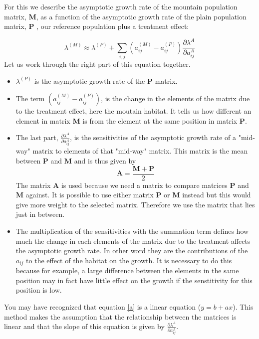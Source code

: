 \documentclass{article}\usepackage[]{graphicx}\usepackage[]{color}
\begin{document}
For this we describe the asymptotic growth rate of the mountain population matrix, $\boldsymbol{M}$, as a function of the asymptotic growth rate of the plain population matrix, $\boldsymbol{P}$ , our reference population plus a treatment effect:  

\begin{equation}\label{a}
\lambda^{(M)} \approx \lambda^{(P)}+\sum_{i,j}{(a^{(M)}_{ij}-a^{(P)}_{ij})} \frac{ \partial\lambda^{A}}{\partial a^{A}_{ij}}
\end{equation}
Let us work through the right part of this equation together. 
\begin{itemize}
\item $\lambda^{(P)}$ is the asymptotic growth rate of the $\boldsymbol{P}$ matrix. 
\item The term ${(a^{(M)}_{ij}-a^{(P)}_{ij})}$, is the change in the elements of the matrix due to the treatment effect, here the moutain habitat. It tells us how different an element in matrix $\boldsymbol{M}$ is from the element at the same position in matrix $\boldsymbol{P}$.
\item The last part, $\frac{ \partial\lambda^{A}}{\partial a^{A}_{ij}}$, is the sensitivities of the asymptotic growth rate of a "mid-way" matrix to elements of that "mid-way" matrix. This matrix is the mean between $\boldsymbol{P}$ and $\boldsymbol{M}$ and is thus given by 
\begin{equation}
\boldsymbol{A}=\frac{\boldsymbol{M}+\boldsymbol{P}}{2}
\end{equation}
The matrix $\boldsymbol{A}$ is used because we need a matrix to compare matrices $\boldsymbol{P}$ and $\boldsymbol{M}$ against. It is possible to use either matrix $\boldsymbol{P}$ or $\boldsymbol{M}$ instead but this would give more weight to the selected matrix. Therefore we use the matrix that lies just in between.
\item The multiplication of the sensitivities with the summation term defines how much the change in each elements of the matrix due to the treatment affects the asymptotic growth rate. In other word they are the contributions of the $a_{ij}$ to the effect of the habitat on the growth. It is necessary to do this because for example, a large difference between the elements in the same position may in fact have little effect on the growth if the senstitivity for this position is low. 
\end{itemize}

You may have recognized that equation \ref{a} is a linear equation ($y=b+ax$). This method makes the assumption that the relationship between the matrices is linear and that the slope of this equation is given by $\frac{ \partial\lambda^{A}}{\partial a^{A}_{ij}}$.
\end{document}
